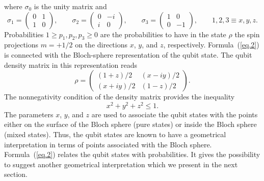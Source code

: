 \documentclass[12pt]{article}
\begin{document}
where $\sigma_0$ is the unity matrix and
\[\sigma_1=\left(\begin{array}{cc}
0&1\\
1&0
\end{array}\right),\qquad \sigma_2=\left(\begin{array}{cc}
0&-i\\
i&0
\end{array}\right), \qquad \sigma_3=\left(\begin{array}{cc}
1&0\\
0&-1
\end{array}\right), \qquad 1,2,3\equiv x,y,z.
\]
Probabilities $1\geq p_1,p_2,p_3\geq 0$ are the probabilities to
have in the state $\rho$ the spin projections $m=+1/2$ on the
directions $x$, $y$, and $z$, respectively. Formula~(\ref{eq.2}) is
connected with the Bloch-sphere representation of the qubit state.
The qubit density matrix in this representation reads
\begin{equation}\label{eq.3}
\rho=\left(\begin{array}{cc}
({1+z})/{2}&({x-i y})/{2}\\
({x+i y})/{2}&({1-z})/{2}
\end{array}\right).
\end{equation}
The nonnegativity condition of the density matrix provides the
inequality
\begin{equation}\label{eq.3a}
x^2+y^2+z^2\leq1.
\end{equation}
The parameters $x$, $y$, and $z$ are used to associate the qubit
states with the points either on the surface of the Bloch sphere
(pure states) or inside the Bloch sphere (mixed states). Thus, the
qubit states are known to have a geometrical interpretation in terms
of points associated with the Bloch sphere. Formula~(\ref{eq.2})
relates the qubit states with probabilities. It gives the
possibility to suggest another geometrical interpretation which we
present in the next section.
\end{document}
